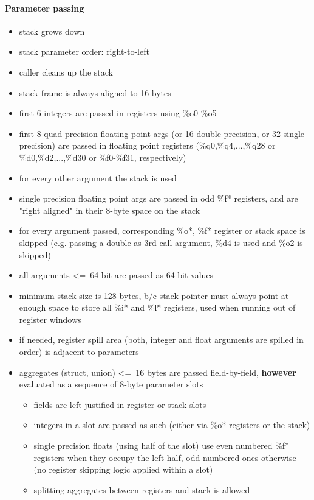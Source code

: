\paragraph{Parameter passing}
\begin{itemize}
\item stack grows down
\item stack parameter order: right-to-left
\item caller cleans up the stack
\item stack frame is always aligned to 16 bytes
\item first 6 integers are passed in registers using \%o0-\%o5
\item first 8 quad precision floating point args (or 16 double precision, or 32 single precision) are passed in floating point registers (\%q0,\%q4,...,\%q28 or \%d0,\%d2,...,\%d30 or \%f0-\%f31, respectively)
\item for every other argument the stack is used
\item single precision floating point args are passed in odd \%f* registers, and are "right aligned" in their 8-byte space on the stack
\item for every argument passed, corresponding \%o*, \%f* register or stack space is skipped (e.g. passing a double as 3rd call argument, \%d4 is used and \%o2 is skipped)
\item all arguments \textless=\ 64 bit are passed as 64 bit values
\item minimum stack size is 128 bytes, b/c stack pointer must always point at enough space to store all \%i* and \%l* registers, used when running out of register windows
\item if needed, register spill area (both, integer and float arguments are spilled in order) is adjacent to parameters
\item aggregates (struct, union) \textless=\ 16 bytes are passed field-by-field, {\bf however} evaluated as a sequence of 8-byte parameter slots
\begin{itemize}
\item fields are left justified in register or stack slots
\item integers in a slot are passed as such (either via \%o* registers or the stack)
\item single precision floats (using half of the slot) use even numbered \%f* registers when they occupy the left half, odd numbered ones otherwise (no register skipping logic applied within a slot)
\item splitting aggregates between registers and stack is allowed

\end{itemize}
\end{itemize}
